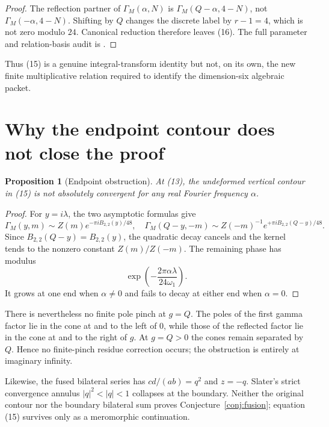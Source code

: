 \documentclass[11pt]{article}
\newtheorem{proposition}[theorem]{Proposition}
\begin{document}
\begin{proof}
The reflection partner of $\Gamma_M(\alpha,N)$ is
$\Gamma_M(Q-\alpha,4-N)$, not
$\Gamma_M(-\alpha,4-N)$.  Shifting by $Q$ changes the discrete label by
$r-1=4$, which is not zero modulo $24$.  Canonical reduction therefore
leaves (16).  The full parameter and relation-basis audit is
.
\end{proof}

Thus (15) is a genuine integral-transform identity but not, on its own,
the new finite multiplicative relation required to identify the
dimension-six algebraic packet.

\section{Why the endpoint contour does not close the proof}

\begin{proposition}[Endpoint obstruction]\label{prop:contour}
At (13), the undeformed vertical contour in (15) is not absolutely
convergent for any real Fourier frequency $\alpha$.
\end{proposition}

\begin{proof}
For $y=i\lambda$, the two asymptotic formulas
\cite[equations (40)--(41)]{SS} give
\[
 \Gamma_M(y,m)\sim
 Z(m)e^{-\pi iB_{2,2}(y)/48},
\quad
 \Gamma_M(Q-y,-m)\sim
 Z(-m)^{-1}e^{+\pi iB_{2,2}(Q-y)/48}.
\tag{18}
\]
Since $B_{2,2}(Q-y)=B_{2,2}(y)$, the quadratic decay cancels and the
kernel tends to the nonzero constant $Z(m)/Z(-m)$.  The remaining
phase has modulus
\[
 \exp\left(-\frac{2\pi\alpha\lambda}{24\omega_1}\right).
\tag{19}
\]
It grows at one end when $\alpha\ne0$ and fails to decay at either end
when $\alpha=0$.
\end{proof}

There is nevertheless no finite pole pinch at $g=Q$.  The poles of the
first gamma factor lie in the cone at and to the left of $0$, while
those of the reflected factor lie in the cone at and to the right of
$g$.  At $g=Q>0$ the cones remain separated by $Q$.  Hence no
finite-pinch residue correction occurs; the obstruction is entirely at
imaginary infinity.

Likewise, the fused bilateral series has
$cd/(ab)=q^2$ and $z=-q$.  Slater's strict convergence annulus
$|q|^2<|q|<1$ collapses at the boundary.  Neither the original contour
nor the boundary bilateral sum proves Conjecture~\ref{conj:fusion};
equation (15) survives only as a meromorphic continuation.
\end{document}
